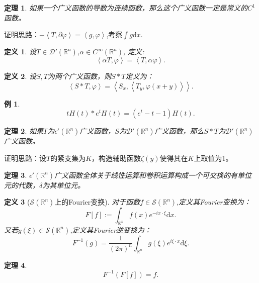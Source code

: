 \documentclass[a4paper]{ctexart}
\newtheorem{Definition}{\hspace{2em}定义}[section]
\newtheorem{Example}{\hspace{2em}例}[section]
\newtheorem{Thm}{\hspace{2em}定理}[section]
\newcommand{\Rn}{\mathbb{R}^{n}}
\newcommand{\dif}{\mathrm{d}}
\newcommand{\innerprod}[2]{\left<#1,#2\right>}
\begin{document}
\begin{Thm}
    如果一个广义函数的导数为连续函数，那么这个广义函数一定是常义的$C^{1}$函数。
\end{Thm}
证明思路：$-\innerprod{T}{\partial\varphi}=\innerprod{g}{\varphi}$,考察$\int g\dif x$.
\begin{Definition}
    设$T\in\mathcal{D}'(\Rn)$,$\alpha\in C^{\infty}(\Rn)$, 定义:
    \begin{equation}
        \innerprod{\alpha T}{\varphi}=\innerprod{T}{\alpha\varphi}.
    \end{equation}
\end{Definition}
\begin{Definition}
    设$S,T$为两个广义函数，则$S*T$定义为：
    \begin{equation}
        \innerprod{S*T}{\varphi}=\innerprod{S_{x}}{\innerprod{T_{y}}{\varphi(x+y)}}.
    \end{equation}
\end{Definition}
\begin{Example}
    \begin{equation}
        tH(t)*e^{t}H(t)=(e^{t}-t-1)H(t).
    \end{equation}
\end{Example}
\begin{Thm}
    如果$T$为$\epsilon'(\Rn)$广义函数，$S$为$\mathcal{D}'(\Rn)$广义函数，那么$S*T$为$\mathcal{D}'(\Rn)$广义函数。
\end{Thm}
证明思路：设$T$的紧支集为$K$，构造辅助函数$\zeta(y)$使得其在$K$上取值为1。
\begin{Thm}
    $\epsilon'(\Rn)$广义函数全体关于线性运算和卷积运算构成一个可交换的有单位元的代数，$\delta$为其单位元。
\end{Thm}
\begin{Definition}[$\mathscr{S}(\Rn)$上的Fourier变换]
    对于函数$f\in\mathscr{S}(\mathbb{R}^{n})$,定义其Fourier变换为：
    \begin{equation}
        F[f]:=\int_{\mathbb{R}^{n}}f(x)e^{-ix\cdot\xi}\dif x.
    \end{equation}
    又若$g(\xi)\in\mathscr{S}(\mathbb{R}^{n})$,定义其Fourier逆变换为：
    \begin{equation}
        F^{-1}(g)=\frac{1}{(2\pi)^{n}}\int_{\mathbb{R}^{n}}g(\xi)e^{i\xi\cdot x}\dif\xi.
    \end{equation}
\end{Definition}
\begin{Thm}
    \begin{equation}
        F^{-1}(F[f])=f.
    \end{equation}
\end{Thm}
\end{document}
